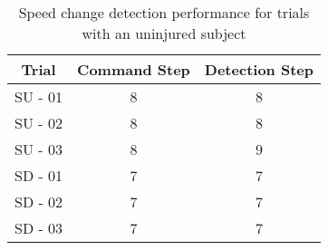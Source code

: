 \begin{table}[tb]
		\centering
		\caption{Speed change detection performance for trials with an uninjured subject} \label{table:ab_results_ag}
		\small
		\begin{tabular}{|c|c|c|}
			\hline 
		Trial	& Command Step & Detection Step \\ 
			\hline 
		SU - 01	& 8 & 8 \\ 
			\hline 
		SU - 02	& 8 & 8 \\ 
			\hline 
		SU - 03	& 8 & 9 \\ 
			\hline 
		SD - 01	& 7 & 7 \\ 
			\hline 
		SD - 02	& 7 & 7 \\ 
			\hline 
		SD - 03	& 7 & 7 \\ 
			\hline 
		\end{tabular} 
\end{table}